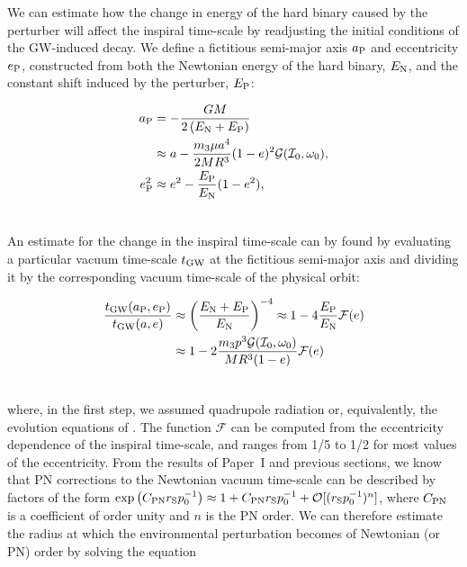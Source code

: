 \documentclass[usenatbib]{mnras}
\begin{document}
We can estimate how the change in energy of the hard binary caused by the perturber will affect the inspiral time-scale by readjusting the initial conditions of the GW-induced decay. We define a fictitious semi-major axis $a_{\rm {P}}$ and eccentricity $e_{\rm{P}}$, constructed from both the Newtonian energy of the hard binary, $E_{\rm N}$, and the constant shift induced by the perturber, $E_{\rm P}$:

\begin{align}
    a_{\rm P} &= -\frac{G M}{2\left(E_{\rm N} +  E_{\rm {P}}\right)} \nonumber \\ &\approx a - \frac{m_3 \mu a^4}{2 M R^3}(1-e)^2\mathcal{G}(\mathcal{I}_0,\omega_0),\\
    e_{\rm{P}}^2 & \approx e^2 - \frac{E_{\rm{P}}}{E_{\rm{N}}}(1-e^2),\\ \nonumber
\end{align}

An estimate for the change in the inspiral time-scale can by found by evaluating a particular vacuum time-scale $t_{\rm{G W}}$ at the fictitious semi-major axis and dividing it by the corresponding vacuum time-scale of the physical orbit:

\begin{align}
\frac{t_{\rm{G W}}(a_{\rm{P}},e_{\rm{P}})}{t_{\rm{G W}}(a,e)} &\approx \left(\frac{E_{\rm N} +  E_{\rm {P}}}{E_{\rm N}} \right)^{-4} \approx 1 - 4 \frac{E_{\rm {P}}}{E_{\rm N}}\mathcal{F}(e) \nonumber
\\ &\approx 1 - 2\frac{m_3 p^3 \mathcal{G}(\mathcal{I}_0,\omega_0)}{ M R^3 (1-e)}\mathcal{F}(e)\\ \nonumber
\end{align}

\noindent where, in the first step, we assumed quadrupole radiation or, equivalently, the evolution equations of \cite{Peters_Mathews_1963}. The function $\mathcal{F}$ can be computed from the eccentricity dependence of the inspiral time-scale, and ranges from 1/5 to 1/2 for most values of the eccentricity. From the results of Paper~I and previous sections, we know that PN corrections to the Newtonian vacuum time-scale can be described by factors of the form $\exp \left( C_{\rm PN} r_{\rm S}p_0^{-1} \right) \approx 1 + C_{\rm PN} r_{\rm S}p_0^{-1} + \mathcal{O}[(r_{\rm S}p_0^{-1})^n]$, where $C_{\rm PN}$ is a coefficient of order unity and $n$ is the PN order. We can therefore estimate the radius at which the environmental perturbation becomes of Newtonian (or PN) order by solving the equation
\end{document}
